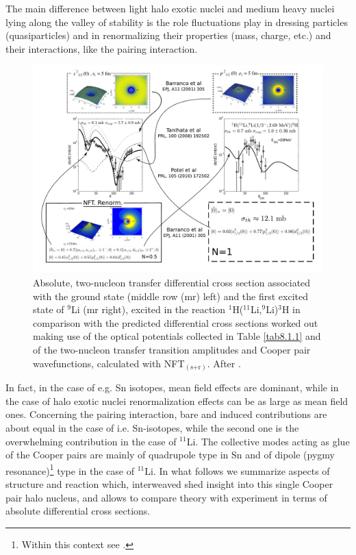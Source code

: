  
  The main difference between light halo exotic nuclei and medium heavy  nuclei lying along the valley of stability is the role fluctuations play in dressing particles (quasiparticles) and in renormalizing their properties (mass, charge, etc.) and their interactions, like the pairing interaction.
  \begin{figure}
  \centerline{\includegraphics*[width=18cm,angle=0]{C8/figsC8/fig8_1_3}}
  	\caption{Absolute, two-nucleon transfer differential cross section associated with the ground state (middle row (mr) left) and the first 	excited state of $^9$Li (mr right), excited  in the reaction $^1$H($^{11}$Li,$^9$Li)$^3$H \citep{Tanihata:08} in comparison with the  predicted differential cross sections \citep{Potel:10} worked out making use of the optical potentials collected in Table \ref{tab8.1.1} and of the two-nucleon transfer  transition amplitudes and  Cooper pair wavefunctions,  calculated with NFT$_{(\text{s+r})}$. After \cite{Broglia:16}.  
  	}\label{fig8_1_2}
  \end{figure}
 In fact, in the case of e.g. Sn isotopes, mean field effects are dominant, while in the case of halo exotic nuclei renormalization effects can be as large as mean field ones. Concerning the pairing interaction, bare and induced contributions are about equal in the case of i.e. Sn-isotopes, while the second one is the overwhelming contribution in the case of $^{11}$Li. The collective modes acting as glue of the Cooper pairs are mainly of quadrupole type in Sn and of dipole (pygmy resonance)\footnote{Within this context see \cite{Broglia:19}.} type in the case of $^{11}$Li. In what follows we summarize aspects of structure and reaction which, interweaved shed insight into this single Cooper pair halo nucleus, and allows to compare theory with experiment in terms of absolute differential cross sections.

